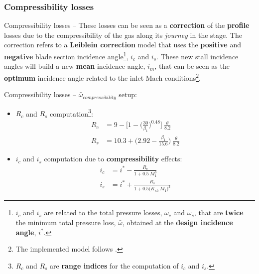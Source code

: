 \subsubsection{Compressibility losses}
	{\nologo
	\begin{frame}{Compressibility losses -- }
		 These losses can be seen as a \textbf{correction} of the \textbf{profile} losses due to the compressibility of the gas along its \textit{journey} in the stage. 
		 \newline
		 \newline
		 The correction refers to a \textbf{Leiblein correction} model that uses the \textbf{positive} and \textbf{negative} blade section incidence angle\footnote{$i_c$ and $i_s$ are related to the total pressure losses, $\bar{\omega}_c$ and $\bar{\omega}_s$, that are \textbf{twice} the minimum total pressure loss, $\bar{\omega}$, obtained at the \textbf{design incidence angle}, $i^*$.}, $i_c$ and $i_s$. 
		 \newline
		 \newline
		 These new stall incidence angles will build a new \textbf{mean} incidence angle, $i_m$, that can be seen as the \textbf{optimum} incidence angle related to the inlet Mach conditions\footnote{The implemented model follows \cite[Sec. 6.6]{axial2004}.}. 
	\end{frame}
	}
	\begin{frame}{Compressibility losses -- }
		$\bar{\omega}_{compressibility}$ setup:
		\begin{itemize}
			\item $R_c$ and $R_s$ computation\footnote{$R_{c}$ and $R_{s}$ are \textbf{range indices} for the computation of $i_c$ and $i_s$.}:
				\begin{align}
					R_c & = 9 - \Bigg[1 - \Bigg( \frac{30}{\beta_1} \Bigg)^{0.48} \Bigg] \ \frac{\theta}{8.2} \nonumber \\
					R_s & = 10.3 + \Bigg( 2.92 - \frac{\beta_1}{15.6} \Bigg) \ \frac{\theta}{8.2} \nonumber  
				\end{align}
			\item $i_c$ and $i_s$ computation due to \textbf{compressibility} effects:
				\begin{align}
					i_c & = i^{*} - \frac{R_c}{1 + 0.5 \ M_{1}^{3}} \nonumber \\
					i_s & = i^{*} + \frac{R_s}{1 + 0.5 \Big( K_{sh} \ M_{1} \Big)^3} \nonumber 
				\end{align}
		\end{itemize}
	\end{frame}

